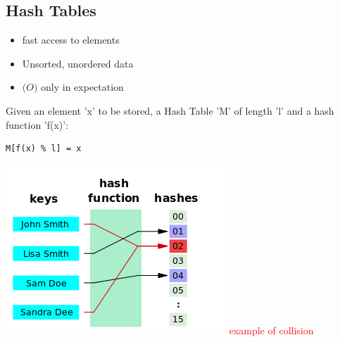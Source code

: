 \subsection{Hash Tables}
    \begin{minipage}{0.49\linewidth}
        \begin{itemize}
            \item fast access to elements
            \item Unsorted, unordered data
            \item $\mathcal(O)$ only in expectation
        \end{itemize}
        Given an element 'x' to be stored, a Hash Table 'M' of length 'l' and a hash function 'f(x)':
        \begin{lstlisting}
M[f(x) % l] = x
\end{lstlisting}
    \end{minipage}
    \begin{minipage}{0.49\linewidth}
        \includegraphics[width = 0.95\linewidth]{src/5_data_structure/images/hash_function.png}
        \textcolor{red}{example of collision}
    \end{minipage}

